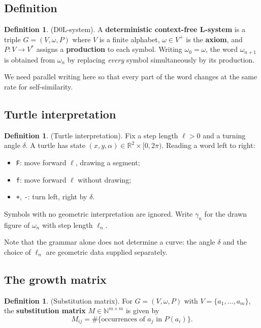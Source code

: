 \documentclass[11pt, a4paper]{article}
\theoremstyle{plain}
\theoremstyle{definition}
\newtheorem{definition}[theorem]{Definition}
\theoremstyle{remark}
\newcommand{\R}{\mathbb{R}}
\newcommand{\N}{\mathbb{N}}
\begin{document}
\subsection{Definition}
\begin{definition}{(D0L-system).}
    A \textbf{deterministic context-free L-system} is a triple $G=(V,\omega,P)$ where $V$ is a finite alphabet, $\omega\in V^+$ is the \textbf{axiom}, and $P:V\to V^*$ assigns a \textbf{production} to each symbol. Writing $\omega_0=\omega$, the word $\omega_{n+1}$ is obtained from $\omega_n$ by replacing \emph{every} symbol simultaneously by its production.
\end{definition}
\noindent We need parallel writing here so that every part of the word changes at the same rate for self-similarity.

\subsection{Turtle interpretation}
\begin{definition}{(Turtle interpretation).}
    Fix a step length $\ell>0$ and a turning angle $\delta$. A turtle has state
    $(x,y,\alpha)\in\R^2\times[0,2\pi)$. Reading a word left to right:
    \begin{itemize}
        \item \texttt{F}: move forward $\ell$, drawing a segment;
        \item \texttt{f}: move forward $\ell$ without drawing;
        \item \texttt{+}, \texttt{-}: turn left, right by $\delta$.
    \end{itemize}
    Symbols with no geometric interpretation are ignored. Write $\gamma_n$ for the drawn figure of $\omega_n$ with step length $\ell_n$.
\end{definition}
\noindent Note that the grammar alone does not determine a curve: the angle
$\delta$ and the choice of $\ell_n$ are geometric data supplied separately.

\subsection{The growth matrix}
\begin{definition}{(Substitution matrix).}
    For $G=(V,\omega,P)$ with $V=\{a_1,\dots,a_m\}$, the \textbf{substitution
    matrix} $M\in\N^{m\times m}$ is given by
    \[
    M_{ij}=\#\{\text{occurrences of } a_j \text{ in } P(a_i)\}.
    \]
\end{definition}
\end{document}
